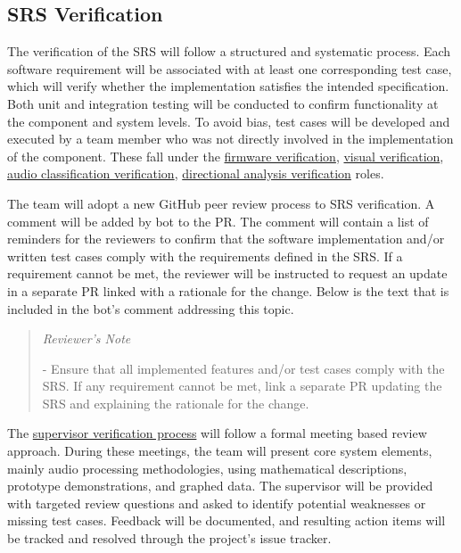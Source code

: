 \documentclass[12pt, titlepage]{article}
\newenvironment{shadedquotation}
    {\begin{quote}\itshape}
    {\end{quote}}
\begin{document}
\subsection{SRS Verification}\label{sec:srs_verification}

The verification of the SRS will follow a structured and systematic process.
Each software requirement will be associated with at least one corresponding
test case, which will verify whether the
implementation satisfies the intended specification. Both unit and integration
testing will be conducted to confirm functionality at the component and system
levels. To avoid bias, test cases will be developed and executed by a team
member who was not directly involved in the implementation of the component.
These fall under the
\hyperref[role:firmware_verfication]{firmware verification},
\hyperref[role:visual_vnv]{visual verification},
\hyperref[role:classification_verfication]{audio classification verification},
\hyperref[role:directional_verfication]{directional analysis verification}
roles. \newline

The team will adopt a new GitHub peer review process to SRS verification. A 
comment will be added by bot to the PR. The comment will contain a list of
reminders for the reviewers to confirm that the
software implementation and/or written test cases comply with the requirements
defined in the SRS. If a requirement cannot be met, the reviewer will be
instructed to request an update in a separate PR linked with a rationale for the
change. Below is the text that is included in the bot's comment addressing this
topic. \newline

\begin{shadedquotation}
Reviewer's Note

- Ensure that all implemented features and/or test cases comply with the SRS.
If any requirement cannot be met, link a separate PR updating the SRS and
explaining the rationale for the change.
\end{shadedquotation}

The 
\hyperref[role:audio_processing_verification]{supervisor verification process}
will follow a formal meeting based review approach. During these meetings,
the team will present core system elements, mainly audio processing
methodologies, using mathematical descriptions, prototype demonstrations,
and graphed data. The supervisor will be provided with targeted review
questions and asked to identify potential weaknesses or missing test cases.
Feedback will be documented, and resulting action items will be tracked
and resolved through the project's issue tracker. \newline
\end{document}
